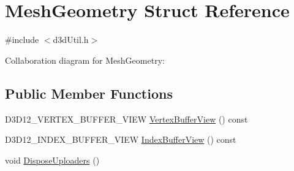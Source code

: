 \hypertarget{struct_mesh_geometry}{}\section{Mesh\+Geometry Struct Reference}
\label{struct_mesh_geometry}


{\ttfamily \#include $<$d3d\+Util.\+h$>$}



Collaboration diagram for Mesh\+Geometry\+:
\subsection*{Public Member Functions}
\begin{DoxyCompactItemize}
\item 
D3\+D12\+\_\+\+V\+E\+R\+T\+E\+X\+\_\+\+B\+U\+F\+F\+E\+R\+\_\+\+V\+I\+EW \hyperlink{struct_mesh_geometry_ad5889970d12977a9d957db2bce40341b_ad5889970d12977a9d957db2bce40341b}{Vertex\+Buffer\+View} () const 
\item 
D3\+D12\+\_\+\+I\+N\+D\+E\+X\+\_\+\+B\+U\+F\+F\+E\+R\+\_\+\+V\+I\+EW \hyperlink{struct_mesh_geometry_a73bb591b341e1afd177f7659d7037e53_a73bb591b341e1afd177f7659d7037e53}{Index\+Buffer\+View} () const 
\item 
void \hyperlink{struct_mesh_geometry_aba9e36f1f4439a88bed25a48cc337ece_aba9e36f1f4439a88bed25a48cc337ece}{Dispose\+Uploaders} ()
\end{DoxyCompactItemize}
